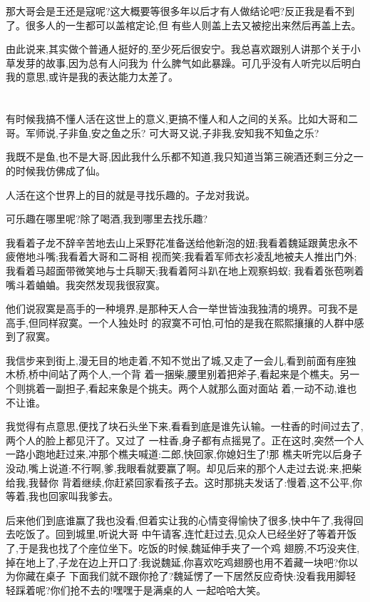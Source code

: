 ﻿\documentclass[12pt,twocolumn]{article}
\begin{document}
那大哥会是王还是寇呢?这大概要等很多年以后才有人做结论吧?反正我是看不到了。很多人的一生都可以盖棺定论,但
有些人则盖上去又被挖出来然后再盖上去。

由此说来,其实做个普通人挺好的,至少死后很安宁。我总喜欢跟别人讲那个关于小草发芽的故事,因为总有人问我为
什么脾气如此暴躁。可几乎没有人听完以后明白我的意思,或许是我的表达能力太差了。

\section{}

有时候我搞不懂人活在这世上的意义,更搞不懂人和人之间的关系。比如大哥和二哥。军师说,子非鱼,安之鱼之乐?
可大哥又说,子非我,安知我不知鱼之乐?

我既不是鱼,也不是大哥,因此我什么乐都不知道,我只知道当第三碗酒还剩三分之一的时候我仿佛成了仙。

人活在这个世界上的目的就是寻找乐趣的。子龙对我说。

可乐趣在哪里呢?除了喝酒,我到哪里去找乐趣?

我看着子龙不辞辛苦地去山上采野花准备送给他新泡的妞;我看着魏延跟黄忠永不疲倦地斗嘴;我看着大哥和二哥相
视而笑;我看着军师衣衫凌乱地被夫人推出门外;我看着马超面带微笑地与士兵聊天;我看着阿斗趴在地上观察蚂蚁;
我看着张苞咧着嘴斗着蛐蛐。我突然发现我很寂寞。

他们说寂寞是高手的一种境界,是那种天人合一举世皆浊我独清的境界。可我不是高手,但同样寂寞。一个人独处时
的寂寞不可怕,可怕的是我在熙熙攘攘的人群中感到了寂寞。

我信步来到街上,漫无目的地走着,不知不觉出了城,又走了一会儿,看到前面有座独木桥,桥中间站了两个人,一个背
着一捆柴,腰里别着把斧子,看起来是个樵夫。另一个则挑着一副担子,看起来象是个挑夫。两个人就那么面对面站
着,一动不动,谁也不让谁。

我觉得有点意思,便找了块石头坐下来,看看到底是谁先认输。一柱香的时间过去了,两个人的脸上都见汗了。又过了
一柱香,身子都有点摇晃了。正在这时,突然一个人一路小跑地赶过来,冲那个樵夫喊道:二郎,快回家,你媳妇生了!那
樵夫听完以后身子没动,嘴上说道:不行啊,爹,我眼看就要赢了啊。却见后来的那个人走过去说:来,把柴给我,我替你
背着继续,你赶紧回家看孩子去。这时那挑夫发话了:慢着,这不公平,你等着,我也回家叫我爹去。

后来他们到底谁赢了我也没看,但着实让我的心情变得愉快了很多,快中午了,我得回去吃饭了。回到城里,听说大哥
中午请客,连忙赶过去,见众人已经坐好了等着开饭了,于是我也找了个座位坐下。吃饭的时候,魏延伸手夹了一个鸡
翅膀,不巧没夹住,掉在地上了,子龙在边上开口了:我说魏延,你喜欢吃鸡翅膀也用不着藏一块吧?你以为你藏在桌子
下面我们就不跟你抢了?魏延愣了一下居然反应奇快:没看我用脚轻轻踩着呢?你们抢不去的!嘿嘿\dldots 于是满桌的人
一起哈哈大笑。
\end{document}
